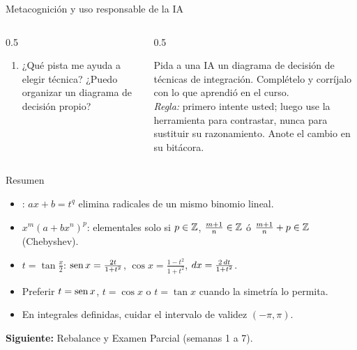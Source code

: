 \documentclass[10pt,aspectratio=169]{beamer}
\begin{document}
\begin{frame}{Metacognición y uso responsable de la IA}
  \small
  \begin{columns}[t]
    \begin{column}{0.5\textwidth}
      \begin{metacog}
        \begin{enumerate}
          \metacomun
          \item ¿Qué pista me ayuda a elegir técnica? ¿Puedo organizar un diagrama de decisión propio?
        \end{enumerate}
      \end{metacog}
    \end{column}
    \begin{column}{0.5\textwidth}
      \begin{iabox}
        Pida a una IA un diagrama de decisión de técnicas de integración. Complételo y corríjalo con lo que aprendió en el curso.\\[2pt]
        \textit{Regla:} primero intente usted; luego use la herramienta para contrastar, nunca para sustituir su razonamiento. Anote el cambio en su bitácora.
      \end{iabox}
    \end{column}
  \end{columns}
\end{frame}

\begin{frame}{Resumen}
  \begin{itemize}
    \item {}: $ax+b=t^q$ elimina radicales de un mismo binomio lineal.
    \item {} $x^m(a+bx^n)^p$: elementales solo si $p\in\mathbb{Z}$, $\frac{m+1}n\in\mathbb{Z}$ ó $\frac{m+1}n+p\in\mathbb{Z}$ (Chebyshev).
    \item {} $t=\tan\frac x2$:
      $\operatorname{sen} x=\frac{2t}{1+t^2}$, $\cos x=\frac{1-t^2}{1+t^2}$, $dx=\frac{2\,dt}{1+t^2}$.
    \item Preferir $t=\operatorname{sen} x$, $t=\cos x$ o $t=\tan x$ cuando la simetría lo permita.
    \item En integrales definidas, cuidar el intervalo de validez $(-\pi,\pi)$.
  \end{itemize}
  \vspace{3mm}
  \textbf{Siguiente:} Rebalance y Examen Parcial (semanas 1 a 7).
\end{frame}
\end{document}

